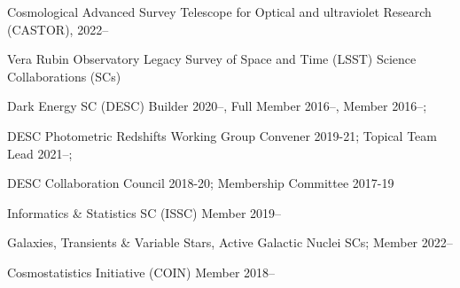\documentclass[11pt,letterpaper]{article}
\begin{document}
%

\begin{list}{}{\malzlist}
	\item Cosmological Advanced Survey Telescope for Optical and ultraviolet Research (CASTOR), 2022--
	\item Vera Rubin Observatory Legacy Survey of Space and Time (LSST) Science Collaborations (SCs)
	\begin{list}{}{\malzlist}
		\item Dark Energy SC (DESC) Builder 2020--, Full Member 2016--, Member 2016--;
		\item DESC Photometric Redshifts Working Group Convener 2019-21; Topical Team Lead 2021--;
		\item DESC Collaboration Council 2018-20; Membership Committee 2017-19
		\item Informatics \& Statistics SC (ISSC) Member 2019--
		\item Galaxies, Transients \& Variable Stars, Active Galactic Nuclei SCs;  Member 2022--
	\end{list}
	\item Cosmostatistics Initiative (COIN) Member 2018--
\end{list}
\end{document}

